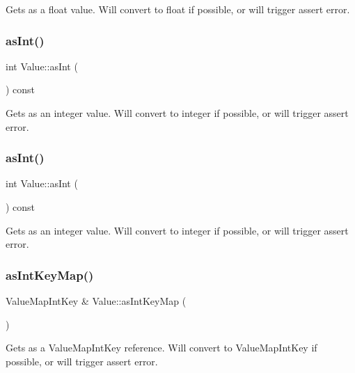 Gets as a float value. Will convert to float if possible, or will trigger assert error. \mbox{\label{classValue_ae2982ec4babf8754de5bcb2842f5127d}} 
\subsubsection{\texorpdfstring{as\+Int()}{asInt()}\hspace{0.1cm}{\footnotesize\ttfamily [1/2]}}
{\footnotesize\ttfamily int Value\+::as\+Int (\begin{DoxyParamCaption}{ }\end{DoxyParamCaption}) const}

Gets as an integer value. Will convert to integer if possible, or will trigger assert error. \mbox{\label{classValue_ae2982ec4babf8754de5bcb2842f5127d}} 
\subsubsection{\texorpdfstring{as\+Int()}{asInt()}\hspace{0.1cm}{\footnotesize\ttfamily [2/2]}}
{\footnotesize\ttfamily int Value\+::as\+Int (\begin{DoxyParamCaption}{ }\end{DoxyParamCaption}) const}

Gets as an integer value. Will convert to integer if possible, or will trigger assert error. \mbox{\label{classValue_a1bc5d0589acbca82e21f37280de61943}} 
\subsubsection{\texorpdfstring{as\+Int\+Key\+Map()}{asIntKeyMap()}\hspace{0.1cm}{\footnotesize\ttfamily [1/4]}}
{\footnotesize\ttfamily Value\+Map\+Int\+Key \& Value\+::as\+Int\+Key\+Map (\begin{DoxyParamCaption}{ }\end{DoxyParamCaption})}

Gets as a Value\+Map\+Int\+Key reference. Will convert to Value\+Map\+Int\+Key if possible, or will trigger assert error. \mbox{\label{classValue_a9876cd521ce9669d60722bc2ac515af2}} 
